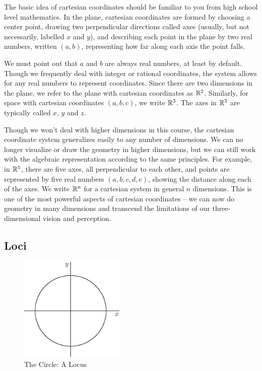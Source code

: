 \documentclass[fleqn]{report}
\begin{document}
The basic idea of cartesian coordinates should be familiar to
you from high school level mathematics. In the plane, 
cartesian coordinates are formed by choosing
a center point, drawing two perpendicular directions called axes
(usually, but not necessarily, labelled $x$ and $y$), and
describing each point in the plane by two real numbers, written
$(a,b)$, representing how far along each axis the point falls.

We must point out that $a$ and $b$ are always real numbers, at
least by default. Though we frequently deal with integer or
rational coordinates, the system allows for any real numbers to
represent coordinates. Since there are two dimensions in the
plane, we refer to the plane with cartesian coordinates as
$\mathbb{R}^2$. Similarly, for space with cartesian coordinates
$(a,b,c)$, we write $\mathbb{R}^3$. The axes in $\mathbb{R}^3$ are typically called
$x$, $y$ and $z$. 

Though we won't deal with higher dimensions in this course, the
cartesian coordinate system generalizes easily to any number
of dimensions. We can no longer visualize or draw the
geometry in higher dimensions, but we can still work with the
algebraic representation according to the same principles.
For example, in $\mathbb{R}^5$, there are five axes, all
perpendicular to each other, and points are represented by
five real numbers $(a,b,c,d,e)$, showing the distance along
each of the axes. We write $\mathbb{R}^n$ for a cartesian system in
general $n$ dimensions. This is one of the most powerful
aspects of cartesian coordinates -- we can now do geometry in
many dimensions and transcend the limitations of our
three-dimensional vision and perception.

\subsection{Loci}
\label{loci}

\begin{figure}[t]
\centering
\includegraphics[width=5cm]{figure64.eps}
\caption{The Circle: A Locus}
\label{figure-circle-locus}
\end{figure}
\end{document}
